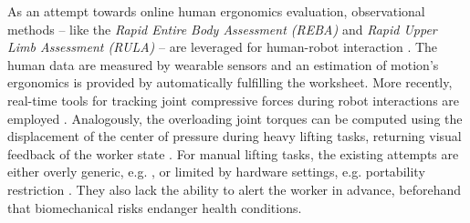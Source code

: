 As an attempt towards online human ergonomics evaluation, observational methods -- like the \emph{Rapid Entire Body Assessment (REBA)} and \emph{Rapid Upper Limb Assessment (RULA)} -- are leveraged for human-robot interaction \cite{Shafti2019}.
The human data are measured by wearable sensors and an estimation of motion's ergonomics is provided by automatically fulfilling the worksheet. More recently, real-time tools for tracking joint compressive forces during robot interactions are employed \cite{Fortini2020ROMAN}. 
Analogously, the overloading joint torques can be computed using the displacement of the center of pressure during heavy lifting tasks, returning visual feedback of the worker state \cite{fortini2020framework}.
%
For manual lifting tasks, the existing attempts are either overly generic, e.g.  \cite{Shafti2019}, or limited by hardware settings, e.g. portability restriction \cite{fortini2020framework}. They also lack the ability to alert the worker in advance, beforehand that biomechanical risks endanger health conditions. 

